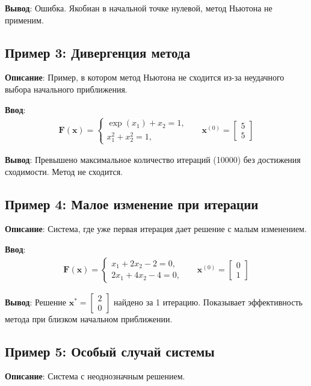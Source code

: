 \textbf{Вывод}: Ошибка. Якобиан в начальной точке нулевой, метод Ньютона не применим.

\subsection{Пример 3: Дивергенция метода}
\textbf{Описание}: Пример, в котором метод Ньютона не сходится из-за неудачного выбора начального приближения.

\textbf{Ввод}: 
\begin{align*}
\mathbf{F}(\mathbf{x}) = \begin{cases}
\exp(x_1) + x_2 = 1,\\
x_1^2 + x_2^2 = 1,
\end{cases}
&& \mathbf{x}^{(0)} = \begin{bmatrix}
5 \\
5
\end{bmatrix}
\end{align*}

\textbf{Вывод}: Превышено максимальное количество итераций (10000) без достижения сходимости. Метод не сходится.

\subsection{Пример 4: Малое изменение при итерации}
\textbf{Описание}: Система, где уже первая итерация дает решение с малым изменением.

\textbf{Ввод}: 
\begin{align*}
\mathbf{F}(\mathbf{x}) = \begin{cases}
x_1 + 2x_2 - 2 = 0,\\
2x_1 + 4x_2 - 4 = 0,
\end{cases}
&& \mathbf{x}^{(0)} = \begin{bmatrix}
0 \\
1
\end{bmatrix}
\end{align*}

\textbf{Вывод}: Решение \( \mathbf{x}^{*} = \begin{bmatrix}
2 \\
0
\end{bmatrix} \) найдено за 1 итерацию. Показывает эффективность метода при близком начальном приближении.

\subsection{Пример 5: Особый случай системы}
\textbf{Описание}: Система с неоднозначным решением.

